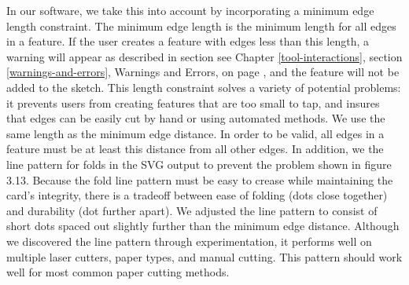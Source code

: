 In our software, we take this into account by incorporating a minimum
edge length constraint. The minimum edge length is the minimum length
for all edges in a feature. If the user creates a feature with edges
less than this length, a warning will appear as described in section see
Chapter \ref{tool-interactions}, section \ref{warnings-and-errors},
Warnings and Errors, on page \pageref{warnings-and-errors}, and the
feature will not be added to the sketch. This length constraint solves a
variety of potential problems: it prevents users from creating features
that are too small to tap, and insures that edges can be easily cut by
hand or using automated methods. We use the same length as the minimum
edge distance. In order to be valid, all edges in a feature must be at
least this distance from all other edges. In addition, we the line
pattern for folds in the SVG output to prevent the problem shown in
figure 3.13. Because the fold line pattern must be easy to crease while
maintaining the card's integrity, there is a tradeoff between ease of
folding (dots close together) and durability (dot further apart). We
adjusted the line pattern to consist of short dots spaced out slightly
further than the minimum edge distance. Although we discovered the line
pattern through experimentation, it performs well on multiple laser
cutters, paper types, and manual cutting. This pattern should work well
for most common paper cutting methods.
